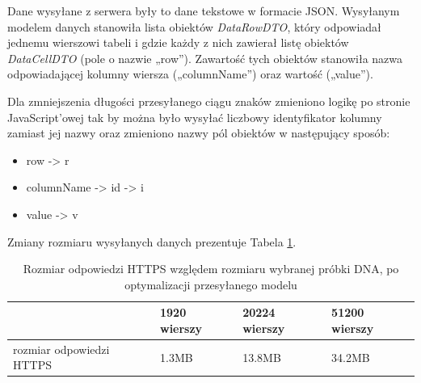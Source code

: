 \documentclass[a4paper,12pt,twoside]{article}
\begin{document}
Dane wysyłane z serwera były to dane tekstowe w formacie JSON.
Wysyłanym modelem danych stanowiła lista obiektów \textit{DataRowDTO},
który odpowiadał jednemu wierszowi tabeli i gdzie każdy z nich zawierał listę obiektów \textit{DataCellDTO} (pole o nazwie „row”). Zawartość tych obiektów stanowiła nazwa
odpowiadającej kolumny wiersza („columnName”) oraz wartość („value”).

Dla zmniejszenia długości przesyłanego ciągu znaków zmieniono logikę po stronie JavaScript'owej tak by
można było wysyłać liczbowy identyfikator kolumny zamiast jej nazwy
oraz zmieniono nazwy pól obiektów w następujący sposób:

\begin{itemize}
\item row -> r
\item columnName -> id -> i
\item value -> v
\end{itemize}
Zmiany rozmiaru wysyłanych danych prezentuje Tabela \ref{table:requestSizeOpt}.
\begin{table} [H]
\begin{tabular}{| p{4cm} | p{2.7cm} | p{2.7cm} | p{2.7cm}|}
\hline
& 1920 wierszy & 20224 wierszy & 51200 wierszy\\
\hline
rozmiar odpowiedzi HTTPS& 1.3MB&13.8MB& 34.2MB\\ \hline
\end{tabular}
\caption{Rozmiar odpowiedzi HTTPS względem rozmiaru wybranej próbki DNA, po optymalizacji przesyłanego modelu}
\label{table:requestSizeOpt}
\end{table}

\newpage
\end{document}
